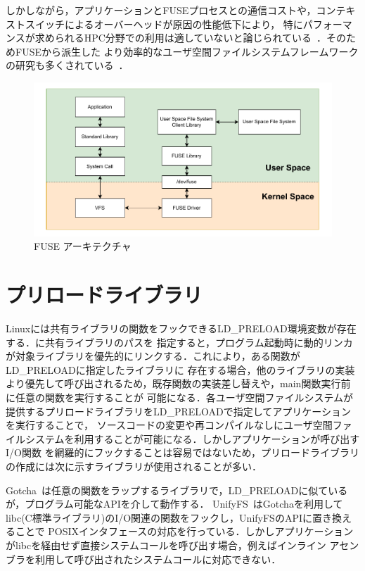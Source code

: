 \documentclass[a4paper,11pt]{jreport}
\begin{document}
しかしながら，アプリケーションとFUSEプロセスとの通信コストや，コンテキストスイッチによるオーバーヘッドが原因の性能低下により，
特にパフォーマンスが求められるHPC分野での利用は適していないと論じられている~\cite{brinkmann2020ad}．そのためFUSEから派生した
より効率的なユーザ空間ファイルシステムフレームワークの研究も多くされている~\cite{294791, zhu2018direct, 3494556}．

\newpage


\begin{figure}[h]
	\begin{minipage}[b]{1\columnwidth}
		\centering
		\includegraphics[width=0.9\linewidth]{./figure/FUSE.pdf}
		\caption{FUSE アーキテクチャ}
		\label{fig:FUSE}
	\end{minipage}
\end{figure}

\newpage


\section{プリロードライブラリ}
Linuxには共有ライブラリの関数をフックできるLD\_PRELOAD環境変数が存在する．に共有ライブラリのパスを
指定すると，プログラム起動時に動的リンカが対象ライブラリを優先的にリンクする．これにより，ある関数がLD\_PRELOADに指定したライブラリに
存在する場合，他のライブラリの実装より優先して呼び出されるため，既存関数の実装差し替えや，main関数実行前に任意の関数を実行することが
可能になる．各ユーザ空間ファイルシステムが提供するプリロードライブラリをLD\_PRELOADで指定してアプリケーションを実行することで，
ソースコードの変更や再コンパイルなしにユーザ空間ファイルシステムを利用することが可能になる．しかしアプリケーションが呼び出すI/O関数
を網羅的にフックすることは容易ではないため，プリロードライブラリの作成には次に示すライブラリが使用されることが多い．

Gotcha~\cite{gotcha}は任意の関数をラップするライブラリで，LD\_PRELOADに似ているが，プログラム可能なAPIを介して動作する．
UnifyFS~\cite{10177390}はGotchaを利用してlibc(C標準ライブラリ)のI/O関連の関数をフックし，UnifyFSのAPIに置き換えることで
POSIXインタフェースの対応を行っている．しかしアプリケーションがlibcを経由せず直接システムコールを呼び出す場合，例えばインライン
アセンブラを利用して呼び出されたシステムコールに対応できない．
\end{document}
